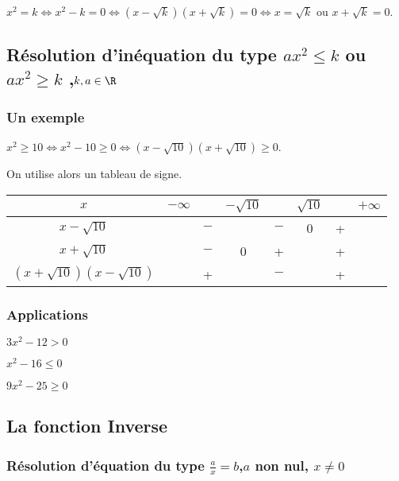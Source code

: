 $x^2=k \Longleftrightarrow x^2-k = 0 \Longleftrightarrow \left(x-\sqrt{k} \right)\left(x+\sqrt{k} \right) = 0 \Longleftrightarrow x=\sqrt{k}$ ou $x+\sqrt{k} =0$. 


\subsection*{Résolution d'inéquation du type $ax^2\leq k$ ou $ax^2\geq k$  ,$k, a \in \R$}

\subsubsection*{Un exemple}
$x^2 \geq 10 \Longleftrightarrow x^2-10 \geq 0 \Longleftrightarrow \left(x-\sqrt{10} \right)\left(x+\sqrt{10} \right) \geq 0$. 

On utilise alors un tableau de signe.

\begin{tabular}{|c|ccccccc|}
\hline 
$x$ & $-\infty$ & & $-\sqrt{10}$ &  & $\sqrt{10}$ &  & $+\infty$ \\ 
\hline 
$x-\sqrt{10}$ & & $-$ &  & $-$ & 0 & + &  \\ 
\hline 
$x+\sqrt{10}$ &  & $-$ & 0 & + &  & + &  \\ 
\hline 
$(x+\sqrt{10})(x-\sqrt{10})$ &  & + &  & $-$ &  & + &  \\ 
\hline 
\end{tabular} 
\fbox{$S=\left] -\infty;\sqrt{10} \right] \cup - \left[\sqrt{10};+\infty \right[ $}

\subsubsection*{Applications}
\begin{list}{•}{}
\item $3x^2-12 > 0$
\item $x^2-16 \leq 0$
\item $9x^2 - 25  \geq 0$
\end{list}

\subsection*{La fonction Inverse}

\subsubsection*{Résolution d'équation du type $\frac{a}{x}=b$,$a$ non nul, $x \neq 0$}

